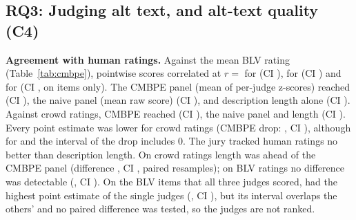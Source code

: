 \subsection{RQ3: Judging alt text, and alt-text quality (C4)}
\textbf{Agreement with human ratings.} Against the mean BLV rating (Table~\ref{tab:cmbpe}),
pointwise scores correlated at $r={}$ for \QV{} (CI
),  for \GM{} (CI
) and  for \MI{} (CI
, on  items only). The CMBPE
panel (mean of per-judge z-scores) reached  (CI ), the naive
panel (mean raw score)  (CI ), and description length alone
 (CI ). Against crowd ratings, CMBPE reached
 (CI ), the naive panel  and length
 (CI ). Every point estimate was lower for crowd ratings (CMBPE drop: , CI ), although
for \QV{} and \GM{} the interval of the drop includes 0.
The jury tracked human ratings no better than description length. On crowd ratings length was
ahead of the CMBPE panel (difference , CI
, paired resamples); on BLV ratings no difference was
detectable (, CI ). On the
 BLV items that all three judges scored, \MI{} had the highest point
estimate of the single judges (, CI
), but its interval overlaps the others' and no paired
difference was tested, so the judges are not ranked.

